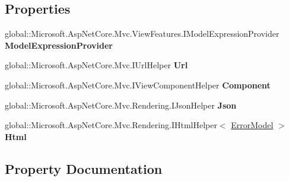 \subsection*{Properties}
\begin{DoxyCompactItemize}
\item 
global\+::\+Microsoft.\+Asp\+Net\+Core.\+Mvc.\+View\+Features.\+I\+Model\+Expression\+Provider {\bfseries Model\+Expression\+Provider}
\item 
\mbox{\label{class_razor_cars_1_1_pages_1_1_pages___error_abfeeffb0638890aa4bcc6c7a392742e9}} 
global\+::\+Microsoft.\+Asp\+Net\+Core.\+Mvc.\+I\+Url\+Helper {\bfseries Url}
\item 
\mbox{\label{class_razor_cars_1_1_pages_1_1_pages___error_aa315285de1db1b69e457fbe82459aa61}} 
global\+::\+Microsoft.\+Asp\+Net\+Core.\+Mvc.\+I\+View\+Component\+Helper {\bfseries Component}
\item 
\mbox{\label{class_razor_cars_1_1_pages_1_1_pages___error_a419e2b8d13061dd839f5f2ea3caa460a}} 
global\+::\+Microsoft.\+Asp\+Net\+Core.\+Mvc.\+Rendering.\+I\+Json\+Helper {\bfseries Json}
\item 
\mbox{\label{class_razor_cars_1_1_pages_1_1_pages___error_adb517cb7e801a2e8528816f65689c4ec}} 
global\+::\+Microsoft.\+Asp\+Net\+Core.\+Mvc.\+Rendering.\+I\+Html\+Helper$<$ \mbox{\hyperlink{class_razor_cars_1_1_pages_1_1_error_model}{Error\+Model}} $>$ {\bfseries Html}
\end{DoxyCompactItemize}


\subsection{Property Documentation}
\mbox{\label{class_razor_cars_1_1_pages_1_1_pages___error_a92e168855159602f4764517710c79875}} 
